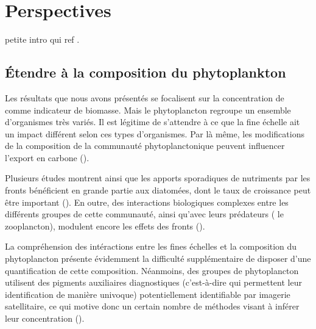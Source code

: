 
\chapter{Perspectives}
\addChpLof
\label{chp:perspectives}
\graphicspath{{resources/perspectives}}

\minitoc%
\clearpage

petite intro qui ref \cite{levy_2023}.

\section{Étendre à la composition du phytoplankton}
\label{sec:persp-pft}


Les résultats que nous avons présentés se focalisent sur la concentration de  comme indicateur de biomasse.
Mais  le phytoplancton regroupe un ensemble d'organismes très variés.
Il est légitime de s'attendre à ce que la fine échelle ait un impact différent selon ces types d'organismes.
Par là même, les modifications de la composition de la communauté phytoplanctonique peuvent influencer l'export en carbone (\cite{treguer_2018,serra-pompei_2022}).

Plusieurs études montrent ainsi que les apports sporadiques de nutriments par les fronts bénéficient en grande partie aux diatomées, dont le taux de croissance peut être important (\cite{allen_2005,taylor_2012,treguer_2018,hernandez-carrasco_2020}).
En outre, des interactions biologiques complexes entre les différents groupes de cette communauté, ainsi qu'avec leurs prédateurs ( le zooplancton), modulent encore les effets des fronts (\cite{mangolte_2022}).

La compréhension des intéractions entre les fines échelles et la composition du phytoplancton présente évidemment la difficulté supplémentaire de disposer d'une quantification de cette composition.
Néanmoins, des groupes de phytoplancton utilisent des pigments auxiliaires diagnostiques (c'est-à-dire qui permettent leur identification de manière univoque) potentiellement identifiable par imagerie satellitaire, ce qui motive donc un certain nombre de méthodes visant à inférer leur concentration (\cite{uitz_2006,uitz_2010,uitz_2012,pan_2010,pan_2010,organelli_2013,chase_2013,chase_2017,bracher_2015a,xi_2020,xi_2021}).

